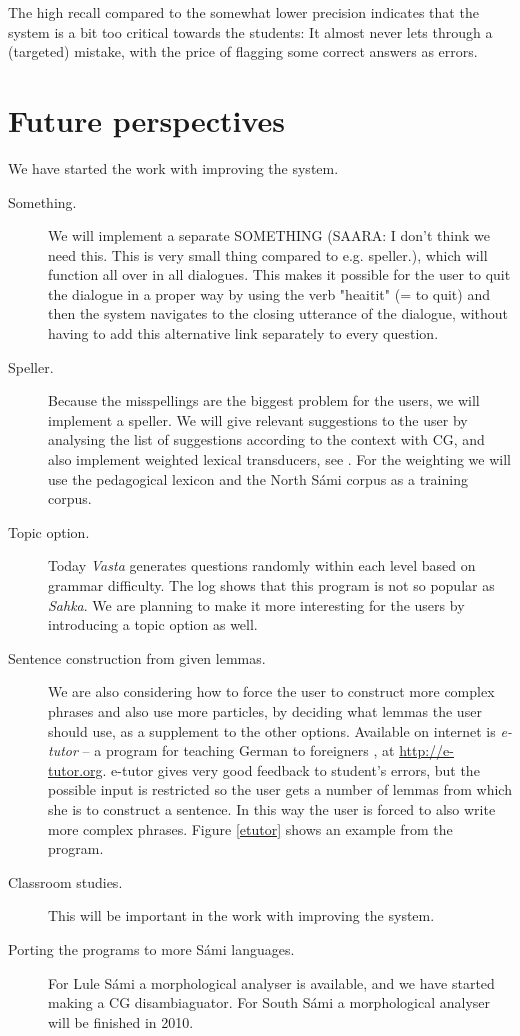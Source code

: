 \documentclass[11pt]{article}
\begin{document}
The high recall compared to the somewhat lower precision indicates that the system is a bit too critical towards the students: It almost never lets through a (targeted) mistake, with the price of flagging some correct answers as errors.
 
\section{Future perspectives}
We have started the work with improving the system.
\begin{description}
\item [Something.] We will implement a separate SOMETHING (SAARA: I don't think we need this. This is very small thing compared to e.g. speller.), which will function all over in all dialogues. This makes it possible for the user to quit the dialogue in a proper way by using the verb "heaitit" (= to quit) and then the system navigates to the closing utterance of the dialogue, without having to add this alternative link separately to every question. 
\item [Speller.] Because the misspellings are the biggest problem for the users, we will implement a speller. We will give relevant suggestions to the user by analysing the list of suggestions according to the context with CG, and also implement weighted lexical transducers, see \cite{Linden:09}. For the weighting we will use the pedagogical lexicon and the North Sámi corpus as a training corpus.
\item [Topic option.] Today \textit{Vasta} generates questions randomly within each level based on grammar difficulty. The log shows that this program is not so popular as \textit{Sahka}. We are planning to make it more interesting for the users by introducing a topic option as well.
\item [Sentence construction from given lemmas.] We are also considering how to force the user to construct more complex phrases and also use more particles, by deciding what lemmas the user should use, as a supplement to the other options. Available on internet is \textit{e-tutor} -- a program for teaching German to foreigners \cite{Heift:01,Heift:02}, at \url{http://e-tutor.org}. e-tutor gives very good feedback to student's errors, but the possible input is restricted so the user gets a number of lemmas from which she is to construct a sentence. In this way the user is forced to also write more complex phrases. Figure \ref{etutor} shows an example from the program.
\item [Classroom studies.] This will be important in the work with improving the system.
\item [Porting the programs to more Sámi languages.] For Lule Sámi a morphological analyser is available, and we have started making a CG disambiaguator. For South Sámi a morphological analyser will be finished in 2010. 
  \end{description} 
  \vspace{0.7cm}
\end{document}
